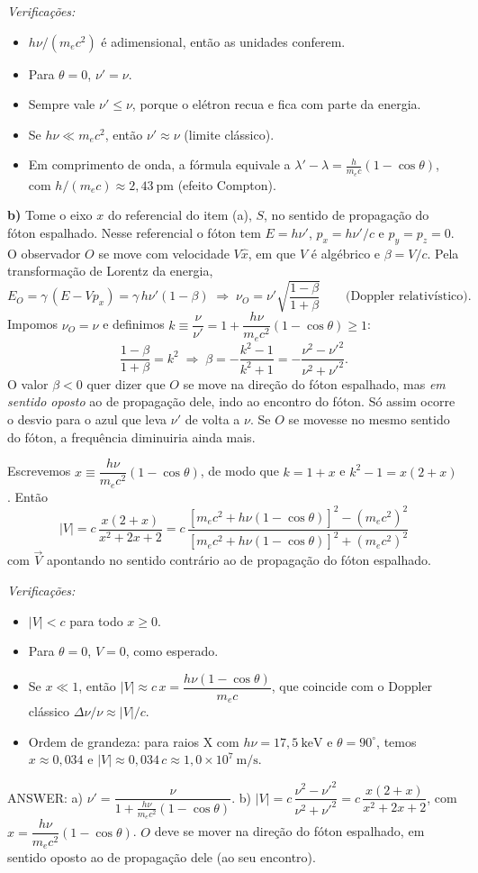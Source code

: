 \documentclass{article}%
\begin{document}
\emph{Verificações:}
\begin{itemize}
\item $h\nu/(m_ec^2)$ é adimensional, então as unidades conferem.
\item Para $\theta=0$, $\nu'=\nu$.
\item Sempre vale $\nu'\le\nu$, porque o elétron recua e fica com parte da energia.
\item Se $h\nu\ll m_ec^2$, então $\nu'\approx\nu$ (limite clássico).
\item Em comprimento de onda, a fórmula equivale a $\lambda'-\lambda=\frac{h}{m_ec}(1-\cos\theta)$, com $h/(m_ec)\approx 2{,}43\ \text{pm}$ (efeito Compton).
\end{itemize}

\medskip
\textbf{b)} Tome o eixo $x$ do referencial do item (a), $S$, no sentido de propagação do fóton espalhado. Nesse referencial o fóton tem $E=h\nu'$, $p_x=h\nu'/c$ e $p_y=p_z=0$. O observador $O$ se move com velocidade $V\hat x$, em que $V$ é algébrico e $\beta=V/c$. Pela transformação de Lorentz da energia,
\[
E_O=\gamma\,(E-Vp_x)=\gamma\,h\nu'(1-\beta)\;\Longrightarrow\;\nu_O=\nu'\sqrt{\frac{1-\beta}{1+\beta}}
\qquad\text{(Doppler relativístico).}
\]
Impomos $\nu_O=\nu$ e definimos $k\equiv \dfrac{\nu}{\nu'}=1+\dfrac{h\nu}{m_ec^2}(1-\cos\theta)\ge 1$:
\[
\frac{1-\beta}{1+\beta}=k^2\;\Longrightarrow\;\beta=-\frac{k^2-1}{k^2+1}=-\frac{\nu^2-\nu'^2}{\nu^2+\nu'^2}.
\]
O valor $\beta<0$ quer dizer que $O$ se move na direção do fóton espalhado, mas \emph{em sentido oposto} ao de propagação dele, indo ao encontro do fóton. Só assim ocorre o desvio para o azul que leva $\nu'$ de volta a $\nu$. Se $O$ se movesse no mesmo sentido do fóton, a frequência diminuiria ainda mais.

Escrevemos $x\equiv \dfrac{h\nu}{m_ec^2}(1-\cos\theta)$, de modo que $k=1+x$ e $k^2-1=x(2+x)$. Então
\[
\boxed{|V|=c\,\frac{x(2+x)}{x^2+2x+2}
= c\,\frac{\left[m_ec^2+h\nu(1-\cos\theta)\right]^2-(m_ec^2)^2}{\left[m_ec^2+h\nu(1-\cos\theta)\right]^2+(m_ec^2)^2}}
\]
com $\vec V$ apontando no sentido contrário ao de propagação do fóton espalhado.

\emph{Verificações:}
\begin{itemize}
\item $|V|<c$ para todo $x\ge 0$.
\item Para $\theta=0$, $V=0$, como esperado.
\item Se $x\ll 1$, então $|V|\approx c\,x=\dfrac{h\nu(1-\cos\theta)}{m_ec}$, que coincide com o Doppler clássico $\Delta\nu/\nu\approx |V|/c$.
\item Ordem de grandeza: para raios X com $h\nu=17{,}5\ \text{keV}$ e $\theta=90^\circ$, temos $x\approx 0{,}034$ e $|V|\approx 0{,}034\,c\approx 1{,}0\times 10^{7}\ \text{m/s}$.
\end{itemize}

\medskip
ANSWER: a) $\nu'=\dfrac{\nu}{1+\frac{h\nu}{m_ec^2}(1-\cos\theta)}$. \quad b) $|V|=c\,\dfrac{\nu^2-\nu'^2}{\nu^2+\nu'^2}=c\,\dfrac{x(2+x)}{x^2+2x+2}$, com $x=\dfrac{h\nu}{m_ec^2}(1-\cos\theta)$. $O$ deve se mover na direção do fóton espalhado, em sentido oposto ao de propagação dele (ao seu encontro).%
\newpage%
\end{document}
